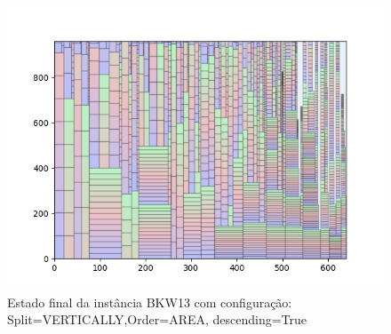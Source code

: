 \begin{figure}[H]
    \centering
    \caption[]{Estado final da instância BKW13 com configuração: Split=VERTICALLY,Order=AREA, descending=True}
    \label{fig:bkw13-vertically-area-true}
    \includegraphics[scale=0.5]{output/figures/bkw/bkw13/vertically/area/true/0000}
\end{figure}